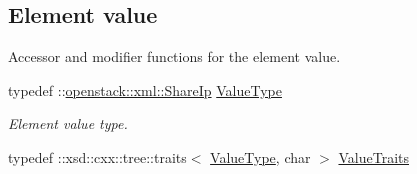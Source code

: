 \subsection*{Element value}
\label{_amgrp2ee2eae1a8c390ea033f241c027da8d6}
Accessor and modifier functions for the element value. \begin{DoxyCompactItemize}
\item 
\hypertarget{classopenstack_1_1xml_1_1ShareIp___aaf9166b6f370ac337a53ce15feb71250}{
typedef ::\hyperlink{classopenstack_1_1xml_1_1ShareIp}{openstack::xml::ShareIp} \hyperlink{classopenstack_1_1xml_1_1ShareIp___aaf9166b6f370ac337a53ce15feb71250}{ValueType}}
\label{classopenstack_1_1xml_1_1ShareIp___aaf9166b6f370ac337a53ce15feb71250}

\begin{DoxyCompactList}\small\item\em Element value type. \item\end{DoxyCompactList}\item 
\hypertarget{classopenstack_1_1xml_1_1ShareIp___a6073931bb56ba3a7d3fc6d72c7985540}{
typedef ::xsd::cxx::tree::traits$<$ \hyperlink{classopenstack_1_1xml_1_1ShareIp}{ValueType}, char $>$ \hyperlink{classopenstack_1_1xml_1_1ShareIp___a6073931bb56ba3a7d3fc6d72c7985540}{ValueTraits}}
\label{classopenstack_1_1xml_1_1ShareIp___a6073931bb56ba3a7d3fc6d72c7985540}


\end{DoxyCompactItemize}
